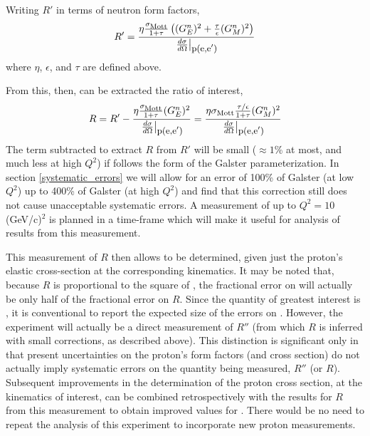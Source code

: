 \documentclass[12pt,letterpaper,oneside]{article}
\begin{document}
Writing $R'$ in terms of neutron form factors,
$$ R'=\frac{\eta\frac{\sigma_{\mbox{\scriptsize Mott}}}
{1+\tau}\left((G_E^n)^2+\frac{\tau}{\epsilon}(G_M^n)^2 \right)}
{\left.\frac{d\sigma}{d\Omega}\right|_{\mbox{\small p(e,e$'$)}}}$$
where
$\eta$, $\epsilon$, and $\tau$ are defined above.  

From this, then, can be extracted the ratio of interest,
\begin{equation}
R=R'-\frac{\eta\frac{\sigma_{\mbox{\scriptsize Mott}}}{1+\tau}(G_E^n)^2}{\left.\frac{d\sigma}{d\Omega}\right|_{\mbox{\small p(e,e$'$)}}}
=\frac{\eta\sigma_{\mbox{\scriptsize Mott}}\frac{\tau/\epsilon}{1+\tau}(G_M^n)^2}
{\left.\frac{d\sigma}{d\Omega}\right|_{\mbox{\small p(e,e$'$)}}}
\label{r_eqn}
\end{equation}
The term subtracted to extract $R$ from $R'$ will be small ($\approx
1$\% at most, and much less at high $Q^2$) if %
\gen follows
the form of the Galster parameterization.  In section
\ref{systematic_errors} we will allow for an error of 100\% of Galster
(at low $Q^2$) up to 400\% of Galster (at high $Q^2$) and find that
this correction still does not cause unacceptable systematic errors.
A measurement of \gen up to $Q^2=10$ (GeV/c)$^2$ is planned\cite{new_GEN}
in a time-frame which will make it useful for analysis of results from
this measurement.

This measurement of $R$ then allows \gmn to be determined, given 
just the proton's
elastic cross-section at the corresponding kinematics.  
It may be noted that, because $R$ is proportional to the square of \gmnc, the
fractional error on \gmn will actually be only half of the fractional
error on $R$.  Since the quantity of greatest interest is \gmnc, it is
conventional to report the expected size of the errors on \gmnc.  
However, the experiment will actually be a direct measurement of 
$R''$ (from which $R$ is
inferred with small corrections, as described above).
This distinction is significant only in that
present uncertainties on the proton's form factors (and cross
section) do not actually imply systematic errors on the quantity
being measured, $R''$ (or $R$).  Subsequent improvements in the determination of the
proton cross section, at the kinematics of interest, can be combined
retrospectively with the results for $R$ from this measurement to
obtain improved values for \gmnc.  There would be no need to repeat the
analysis of this experiment to incorporate new proton measurements.
\end{document}
